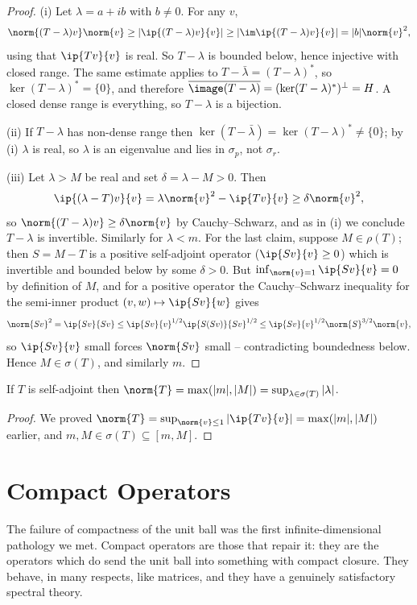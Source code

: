 \begin{proof}
	(i) Let $\lambda = a+ib$ with $b \neq 0$. For any $v$,
	$$\norm{(T-\lambda)v}\norm{v}\geq|\ip{(T-\lambda)v}{v}|\geq|\im\ip{(T-\lambda)v}{v}| = |b|\norm{v}^2,$$
	using that $\ip{Tv}{v}$ is real. So $T-\lambda$ is bounded below, hence injective with closed range. The same estimate applies to $T - \bar\lambda = (T-\lambda)^*$, so $\ker(T-\lambda)^*=\{0\}$, and therefore $\overline{\image(T-\lambda)} = (\ker(T-\lambda)^*)^\perp = H$. A closed dense range is everything, so $T-\lambda$ is a bijection.

	(ii) If $T-\lambda$ has non-dense range then $\ker(T-\bar\lambda) = \ker(T-\lambda)^* \neq\{0\}$; by (i) $\lambda$ is real, so $\lambda$ is an eigenvalue and lies in $\sigma_p$, not $\sigma_r$.

	(iii) Let $\lambda>M$ be real and set $\delta = \lambda - M>0$. Then
	$$\ip{(\lambda - T)v}{v} = \lambda\norm{v}^2 - \ip{Tv}{v}\geq\delta\norm{v}^2,$$
	so $\norm{(T-\lambda)v}\geq\delta\norm{v}$ by Cauchy--Schwarz, and as in (i) we conclude $T-\lambda$ is invertible. Similarly for $\lambda<m$. For the last claim, suppose $M \in \rho(T)$; then $S = M - T$ is a positive self-adjoint operator ($\ip{Sv}{v}\geq0$) which is invertible and bounded below by some $\delta>0$. But $\inf_{\norm{v}=1}\ip{Sv}{v} = 0$ by definition of $M$, and for a positive operator the Cauchy--Schwarz inequality for the semi-inner product $(v,w)\mapsto\ip{Sv}{w}$ gives
	$$\norm{Sv}^2 = \ip{Sv}{Sv}\leq\ip{Sv}{v}^{1/2}\ip{S(Sv)}{Sv}^{1/2}\leq \ip{Sv}{v}^{1/2}\norm{S}^{3/2}\norm{v},$$
	so $\ip{Sv}{v}$ small forces $\norm{Sv}$ small -- contradicting boundedness below. Hence $M\in\sigma(T)$, and similarly $m$.
\end{proof}

\begin{corollary}
	If $T$ is self-adjoint then $\norm{T} = \max(|m|,|M|) = \sup_{\lambda\in\sigma(T)}|\lambda|$.
\end{corollary}

\begin{proof}
	We proved $\norm{T} = \sup_{\norm{v}\leq1}|\ip{Tv}{v}| = \max(|m|,|M|)$ earlier, and $m, M \in \sigma(T)\subseteq[m,M]$.
\end{proof}

\section{Compact Operators}

The failure of compactness of the unit ball was the first infinite-dimensional pathology we met. Compact operators are those that repair it: they are the operators which do send the unit ball into something with compact closure. They behave, in many respects, like matrices, and they have a genuinely satisfactory spectral theory.


